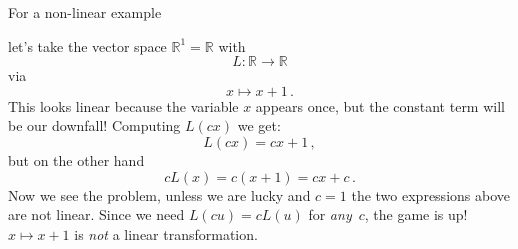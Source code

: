 {\hypertarget{non_linear_example}{For a non-linear example} let's take the vector space ${\mathbb R}^1= {\mathbb R}$
with
\[L: {\mathbb R}\longrightarrow  {\mathbb R}\]
via
\[ x\mapsto x+1\, .\]
This looks linear because the variable $x$ appears once, but the constant term will be our downfall!
Computing $L(cx)$ we get:
\[
L(cx) = cx +1\, ,
\]
but on the other hand
\[
cL(x) = c(x+1) = cx +c\, .
\]
Now we see the problem, unless we are lucky and $c=1$ the two expressions above are not linear. Since we
need $L(cu)=cL(u)$ for {\itshape any}~$c$, the game is up! $x\mapsto x+1$ is {\itshape not} a linear transformation.

}

\newpage
